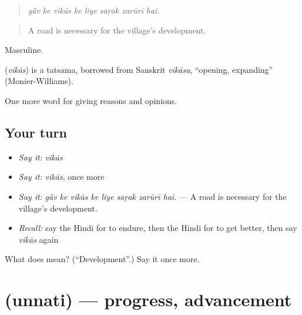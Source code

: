 \begin{quote}
       
\end{quote}

\begin{quote}
\emph{gā̃v ke vikās ke liye saṛak zarūrī hai.}
\end{quote}

\begin{quote}
A road is necessary for the village's development.
\end{quote}

Masculine.

\begin{cousinweb}
\textbf{} (\emph{vikās}) is a tatsama, borrowed from Sanskrit \emph{vikāsa}, \textquotedblleft{}opening, expanding\textquotedblright{} (Monier-Williams).
\end{cousinweb}

\begin{grammarlens}[title={What you've built}]
One more word for giving reasons and opinions.
\end{grammarlens}

\subsection*{Your turn}
\begin{itemize}
\raggedright
  \item \emph{Say it:} \emph{vikās}
  \item \emph{Say it:} \emph{vikās}, once more
  \item \emph{Say it:} \emph{gā̃v ke vikās ke liye saṛak zarūrī hai.} — A road is necessary for the village's development.
  \item \emph{Recall:} say the Hindi for to endure, then the Hindi for to get better, then say \emph{vikās} again
\end{itemize}

\begin{tcolorbox}[breakable,colback=teal!4,colframe=teal!35!black,title={Before you move on}]
What does  mean? (\textquotedblleft{}Development\textquotedblright{}.) Say it once more.
\end{tcolorbox}
\section[\texorpdfstring{\hi{उन्नति} (unnati)}{उन्नति (unnati)}]{ (unnati) — progress, advancement}

